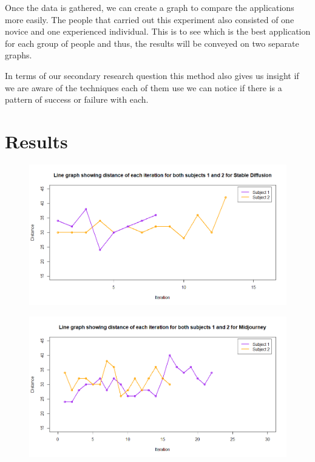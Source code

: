 \documentclass[]{report}
\begin{document}
	Once the data is gathered, we can create a graph to compare the applications more easily. The people that carried out this experiment also consisted of one novice and one experienced individual. This is to see which is the best application for each group of people and thus, the results will be conveyed on two separate graphs.
	
	In terms of our secondary research question this method also gives us insight if we are aware of the techniques each of them use we can notice if there is a pattern of success or failure with each.
	
	\pagebreak
	\section{Results}   
    
	\begin{figure}[!!htbp]
		\centering
		\includegraphics[width=1\linewidth]{LineGraphStableDiff}
		\caption{}
		\label{fig:linegraphstablediff}
	\end{figure}

\begin{figure}[!htbp]
	\centering
	\includegraphics[width=1\linewidth]{LineGraphMidJ}
	\caption{}
	\label{fig:linegraphmidj}
\end{figure}
\end{document}
